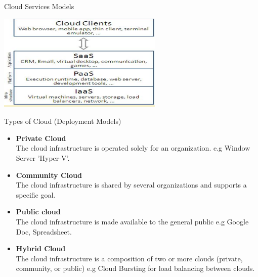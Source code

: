 \documentclass{SKP-beamer}
\begin{document}
\begin{frame}{Cloud Services Models}
    
     	\includegraphics[scale=1.5]{12.png}
     
\end{frame}



\begin{frame}{Types of Cloud (Deployment Models)}
	\begin{itemize}
		
	\item  \textbf{Private Cloud} \\
	The cloud infrastructure is operated solely for an organization.
	e.g Window Server 'Hyper-V'. \\
	
	\item  \textbf{Community Cloud} \\
	The cloud infrastructure is shared by several organizations and supports a specific goal.
	
	\item \textbf{Public cloud} \\
	The cloud infrastructure is made available to the general public
	e.g Google Doc, Spreadsheet.
	\item \textbf{Hybrid Cloud} \\
	The cloud infrastructure is a composition of two or more clouds (private, community, or public)
	e.g Cloud Bursting for load balancing between clouds.
	
	\end{itemize}
\end{frame}
\end{document}
